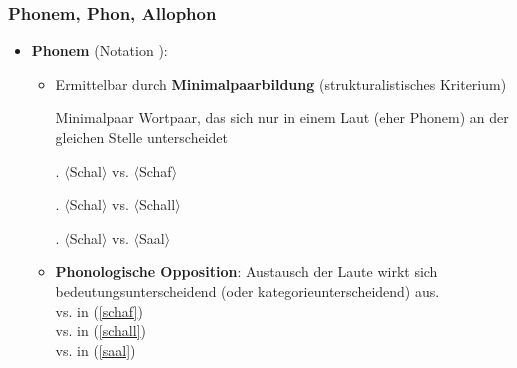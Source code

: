 
\begin{frame}
\frametitle{Phonem, Phon, Allophon}

\begin{itemize}
	\item \textbf{Phonem} (Notation \textipa{/ /}):
	
	\begin{itemize}
		\item Ermittelbar durch \textbf{Minimalpaarbildung} (strukturalistisches Kriterium)
		
		\begin{block}{Minimalpaar}
Wortpaar, das sich nur in einem Laut (eher Phonem) an der gleichen Stelle unterscheidet
		\end{block}
	
		\ex.\label{schaf} \textipa{[Sa:l]} $\langle$Schal$\rangle$ vs. \textipa{[Sa:f]} $\langle$Schaf$\rangle$
		
		\ex.\label{schall} \textipa{[Sa:l]} $\langle$Schal$\rangle$ vs. \textipa{[Sal]} $\langle$Schall$\rangle$
		
		\ex.\label{saal} \textipa{[Sa:l]} $\langle$Schal$\rangle$ vs. \textipa{[za:l]} $\langle$Saal$\rangle$
		
		\item \textbf{Phonologische Opposition}: Austausch der Laute wirkt sich bedeutungsunterscheidend (oder kategorieunterscheidend) aus.\\
		 vs.  in (\ref{schaf})\\
		 vs.  in (\ref{schall})\\
		 vs.  in (\ref{saal})				
	\end{itemize}
	
\end{itemize}

\end{frame}




